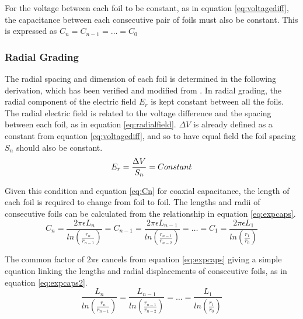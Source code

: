 For the voltage between each foil to be constant, as in equation \ref{eq:voltagediff}, the capacitance between each consecutive pair of foils must also be constant. This is expressed as $C_n = C_{n-1} = \dots = C_0$

\subsubsection{Radial Grading}
The radial spacing and dimension of each foil is determined in the following derivation, which has been verified and modified from \cite{kuffel2000high}.
In radial grading, the radial component of the electric field $E_r$ is kept constant between all the foils.
The radial electric field is related to the voltage difference and the spacing between each foil, as in equation \ref{eq:radialfield}. $\Delta V$ is already defined as a constant from equation \ref{eq:voltagediff}, and so to have equal field the foil spacing $S_n$ should also be constant. 
\begin{equation}
   \label{eq:radialfield}
   E_r = \displaystyle\displaystyle\frac{\Delta V}{S_n} = Constant
\end{equation}

Given this condition and equation \ref{eq:Cn} for coaxial capacitance, the length of each foil is required to change from foil to foil.
The lengths and radii of consecutive foils can be calculated from the relationship in equation \ref{eq:expcaps}.
\begin{equation}
   \label{eq:expcaps}
   C_n = \displaystyle\frac{2\pi\epsilon L_{n}}{ln(\displaystyle\frac{r_{n}}{r_{n-1}})} = C_{n-1} = \displaystyle\frac{2\pi\epsilon L_{n-1}}{ln(\displaystyle\frac{r_{n-1}}{r_{n-2}})} = \dots = C_{1} = \displaystyle\frac{2\pi\epsilon L_{1}}{ln(\displaystyle\frac{r_{1}}{r_{0}})}
\end{equation}

The common factor of $2\pi\epsilon$ cancels from equation \ref{eq:expcaps} giving a simple equation linking the lengths and radial displacements of consecutive foils, as in equation \ref{eq:expcaps2}.
\begin{equation}
   \label{eq:expcaps2}
   \displaystyle\frac{L_{n}}{ln(\displaystyle\frac{r_{n}}{r_{n-1}})} = \displaystyle\frac{ L_{n-1}}{ln(\displaystyle\frac{r_{n-1}}{r_{n-2}})} = \dots = \displaystyle\frac{ L_{1}}{ln(\displaystyle\frac{r_{1}}{r_{0}})}
\end{equation}

